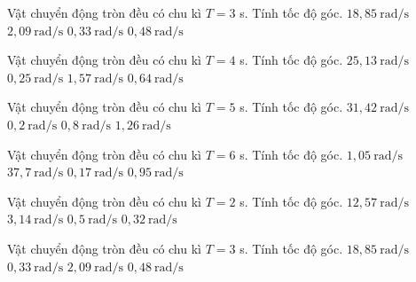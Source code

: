\begin{ex}
Vật chuyển động tròn đều có chu kì $T=3$ s. Tính tốc độ góc.
\choice
{$18,85\ \mathrm{rad/s}$}
{\True $2,09\ \mathrm{rad/s}$}
{$0,33\ \mathrm{rad/s}$}
{$0,48\ \mathrm{rad/s}$}
\end{ex}

\begin{ex}
Vật chuyển động tròn đều có chu kì $T=4$ s. Tính tốc độ góc.
\choice
{$25,13\ \mathrm{rad/s}$}
{$0,25\ \mathrm{rad/s}$}
{\True $1,57\ \mathrm{rad/s}$}
{$0,64\ \mathrm{rad/s}$}
\end{ex}

\begin{ex}
Vật chuyển động tròn đều có chu kì $T=5$ s. Tính tốc độ góc.
\choice
{$31,42\ \mathrm{rad/s}$}
{$0,2\ \mathrm{rad/s}$}
{$0,8\ \mathrm{rad/s}$}
{\True $1,26\ \mathrm{rad/s}$}
\end{ex}

\begin{ex}
Vật chuyển động tròn đều có chu kì $T=6$ s. Tính tốc độ góc.
\choice
{\True $1,05\ \mathrm{rad/s}$}
{$37,7\ \mathrm{rad/s}$}
{$0,17\ \mathrm{rad/s}$}
{$0,95\ \mathrm{rad/s}$}
\end{ex}

\begin{ex}
Vật chuyển động tròn đều có chu kì $T=2$ s. Tính tốc độ góc.
\choice
{$12,57\ \mathrm{rad/s}$}
{\True $3,14\ \mathrm{rad/s}$}
{$0,5\ \mathrm{rad/s}$}
{$0,32\ \mathrm{rad/s}$}
\end{ex}

\begin{ex}
Vật chuyển động tròn đều có chu kì $T=3$ s. Tính tốc độ góc.
\choice
{$18,85\ \mathrm{rad/s}$}
{$0,33\ \mathrm{rad/s}$}
{\True $2,09\ \mathrm{rad/s}$}
{$0,48\ \mathrm{rad/s}$}
\end{ex}

